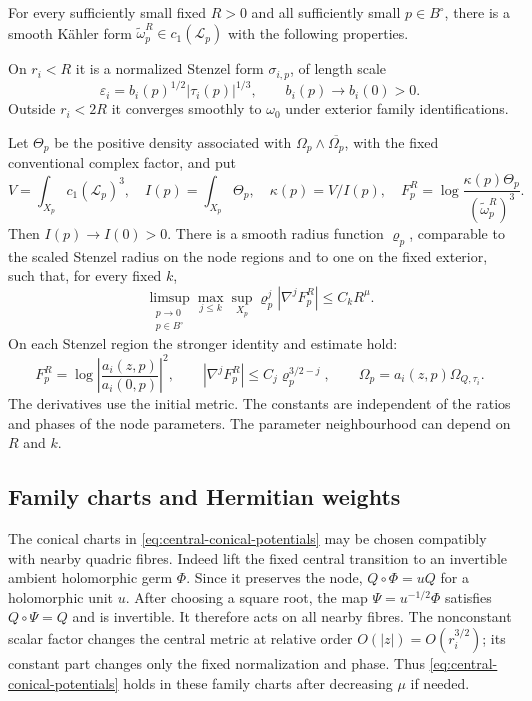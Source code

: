 \begin{proposition}\label{prop:initial-kahler}
For every sufficiently small fixed $R>0$ and all sufficiently
small $p\in B^\circ$, there is a smooth Kähler form
$\widetilde\omega_p^R\in c_1(\mathcal L_p)$ with the following
properties.

On $r_i<R$ it is a normalized Stenzel form $\sigma_{i,p}$,
of length scale
\begin{equation}\label{eq:normalized-cap-scales}
 \varepsilon_i=b_i(p)^{1/2}|\tau_i(p)|^{1/3},
 \qquad b_i(p)\longrightarrow b_i(0)>0.
\end{equation}
Outside $r_i<2R$ it converges smoothly to $\omega_0$ under
exterior family identifications.

Let $\Theta_p$ be the positive density associated with
$\Omega_p\wedge\overline{\Omega_p}$, with the fixed conventional
complex factor, and put
\[
 V=\int_{X_p}c_1(\mathcal L_p)^3,\quad
 I(p)=\int_{X_p}\Theta_p,\quad
 \kappa(p)=V/I(p),\quad
 F_p^R=\log\frac{\kappa(p)\Theta_p}
                         {(\widetilde\omega_p^R)^3}.
\]
Then $I(p)\to I(0)>0$. There is a smooth radius function
$\varrho_p$, comparable to the scaled Stenzel radius on the
node regions and to one on the fixed exterior, such that, for
every fixed $k$,
\begin{equation}\label{eq:initial-residual}
 \limsup_{\substack{p\to0\\p\in B^\circ}}
 \max_{j\le k}\sup_{X_p}
       \varrho_p^j|\nabla^j F_p^R|\le C_kR^\mu.
\end{equation}
On each Stenzel region the stronger identity and estimate hold:
\begin{equation}\label{eq:pluriharmonic-residual}
 F_p^R=\log\left|\frac{a_i(z,p)}{a_i(0,p)}\right|^2,
 \qquad |\nabla^jF_p^R|\le C_j\varrho_p^{3/2-j},
 \qquad \Omega_p=a_i(z,p)\Omega_{Q,\tau_i}.
\end{equation}
The derivatives use the initial metric. The constants are
independent of the ratios and phases of the node parameters.
The parameter neighbourhood can depend on $R$ and $k$.
\end{proposition}

\subsection{Family charts and Hermitian weights}

The conical charts in \eqref{eq:central-conical-potentials} may
be chosen compatibly with nearby quadric fibres. Indeed lift
the fixed central transition to an invertible ambient holomorphic
germ $\Phi$. Since it preserves the node, $Q\circ\Phi=uQ$ for
a holomorphic unit $u$. After choosing a square root, the map
$\Psi=u^{-1/2}\Phi$ satisfies $Q\circ\Psi=Q$ and is invertible.
It therefore acts on all nearby fibres. The nonconstant scalar
factor changes the central metric at relative order
$O(|z|)=O(r_i^{3/2})$; its constant part changes only the fixed
normalization and phase. Thus
\eqref{eq:central-conical-potentials} holds in these family
charts after decreasing $\mu$ if needed.

